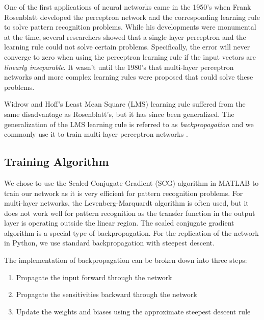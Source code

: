 \documentclass[12pt,halfline,a4paper]{ouparticle}
\begin{document}
One of the first applications of neural networks came in the 1950's when Frank Rosenblatt developed the perceptron network and the corresponding learning rule to solve pattern recognition problems. While his developments were monumental at the time, several researchers showed that a single-layer perceptron and the learning rule could not solve certain problems. Specifically, the error will never converge to zero when using the perceptron learning rule if the input vectors are \emph{linearly inseparable}. It wasn't until the 1980's that multi-layer perceptron networks and more complex learning rules were proposed that could solve these problems. 

Widrow and Hoff's Least Mean Square (LMS) learning rule suffered from the same disadvantage as Rosenblatt's, but it has since been generalized. The generalization of the LMS learning rule is referred to as \emph{backpropagation} and we commonly use it to train multi-layer perceptron networks \cite{hagan2014}. 

\subsection{Training Algorithm}
\label{sec4.2}
We chose to use the Scaled Conjugate Gradient (SCG) algorithm in MATLAB to train our network as it is very efficient for pattern recognition problems. For multi-layer networks, the Levenberg-Marquardt algorithm is often used, but it does not work well for pattern recognition as the transfer function in the output layer is operating outside the linear region. The scaled conjugate gradient algorithm is a special type of backpropagation. For the replication of the network in Python, we use standard backpropagation with steepest descent. 

The implementation of backpropagation can be broken down into three steps: 
\begin{enumerate}
\item Propagate the input forward through the network
\item Propagate the sensitivities backward through the network
\item Update the weights and biases using the approximate steepest descent rule
\end{enumerate}
\end{document}
